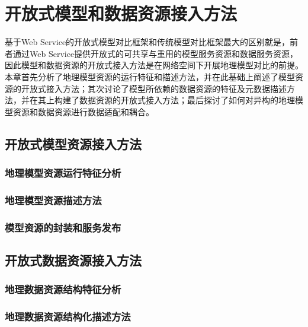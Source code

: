 \chapter{开放式模型和数据资源接入方法}
基于Web Service的开放式模型对比框架和传统模型对比框架最大的区别就是，前者通过Web Service提供开放式的可共享与重用的模型服务资源和数据服务资源，因此模型和数据资源的开放式接入方法是在网络空间下开展地理模型对比的前提。本章首先分析了地理模型资源的运行特征和描述方法，并在此基础上阐述了模型资源的开放式接入方法；其次讨论了模型所依赖的数据资源的特征及元数据描述方法，并在其上构建了数据资源的开放式接入方法；最后探讨了如何对异构的地理模型资源和数据资源进行数据适配和耦合。

\section{开放式模型资源接入方法}

\subsection{地理模型资源运行特征分析}

\subsection{地理模型资源描述方法}
\subsection{模型资源的封装和服务发布}

\section{开放式数据资源接入方法}
\subsection{地理数据资源结构特征分析}
\subsection{地理数据资源结构化描述方法}
